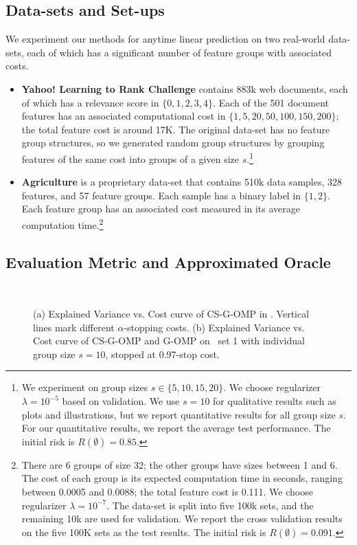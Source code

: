 \subsection{Data-sets and Set-ups}
We experiment our methods for anytime linear prediction on two real-world data-sets,
each of which has a significant number of feature groups with associated costs. 

\begin{itemize}[leftmargin=*]
\item \textbf{Yahoo! Learning to Rank Challenge} \citep{yahoo_ltr}
contains 883k web documents, each of which has a relevance score in $\{0, 1, 2, 3, 4\}$. Each of the 501 document features has an associated computational cost in 
$\{ 1, 5, 20, 50, 100, 150, 200\}$; the total feature cost is around 17K. The original data-set has no feature group structures, so we generated random group structures by grouping features of the same cost into groups of a given size $s$.\footnote{We experiment on group sizes $s \in \{ 5, 10, 15, 20 \}$. We choose regularizer 
$\lambda = 10^{-5}$ based on validation. We use 
$s=10$ for qualitative results such as plots and illustrations, but we report quantitative results for all group size $s$. For our quantitative results, we report the average test performance. The initial risk is $R(\emptyset)=0.85$.}

\item \textbf{Agriculture} is a proprietary data-set that contains 510k data samples, 328 features, and 57 feature groups. Each sample has a binary label in $\{1, 2\}$. Each feature group has an associated cost measured in its 
average computation time.\footnote{
There are 6 groups of size 32; the other groups have sizes between 1 and 6. 
The cost of each group is its expected computation time in seconds, ranging between 0.0005 and 0.0088; the total feature cost is 0.111. 
We choose regularizer $\lambda = 10^{-7}$. The data-set is 
split into five 100k sets, and the remaining 10k are used for validation. We report the cross validation results on the five 100K sets as the test results. The initial risk is $R(\emptyset) = 0.091$.}
\end{itemize}

\subsection{Evaluation Metric and Approximated Oracle}
\label{sec:timeliness}
\begin{figure}[ht!]
\centering
{}
~
\label{fig:timeliness}
\caption{(a) Explained Variance vs. Cost curve of CS-G-OMP in
\YahooLTR. Vertical lines mark different $\alpha$-stopping costs.  (b) Explained Variance vs. Cost curve of CS-G-OMP and G-OMP on \YahooLTR\, set 1 with individual group size $s=10$, stopped at 0.97-stop cost.}
\end{figure}

